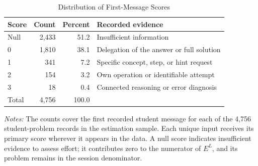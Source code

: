 \begin{table}[htbp]
\centering
\begingroup
{}
\small
\setlength{\tabcolsep}{5pt}
\caption{Distribution of First-Message Scores}
\label{tab:llm-distribution}
\begin{tabular}{lrrl}
\toprule
Score & Count & Percent & Recorded evidence \\
\midrule
Null & 2,433 & 51.2 & Insufficient information \\
0 & 1,810 & 38.1 & Delegation of the answer or full solution \\
1 & 341 & 7.2 & Specific concept, step, or hint request \\
2 & 154 & 3.2 & Own operation or identifiable attempt \\
3 & 18 & 0.4 & Connected reasoning or error diagnosis \\
\midrule
Total & 4,756 & 100.0 &  \\
\bottomrule
\end{tabular}
\par\medskip
\begin{minipage}{\linewidth}
\footnotesize
\textit{Notes:} The counts cover the first recorded student message for each of the 4,756 student-problem records in the estimation sample. Each unique input receives its primary score wherever it appears in the data. A null score indicates insufficient evidence to assess effort; it contributes zero to the numerator of $E^{L}$, and its problem remains in the session denominator.
\end{minipage}
\endgroup
\end{table}
